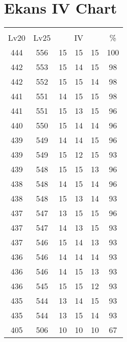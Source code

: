 \documentclass{article}%
\begin{document}
%
\normalsize%
\section{Ekans IV Chart}%
\label{sec:Ekans IV Chart}%
\renewcommand{\arraystretch}{1.5}%
\begin{tabular}{|c|c|c|c|c|c|}%
\hline%
\multicolumn{6}{|c|}{\textcolor{white}{ 
\linebreak{Ekans}
}%
\cellcolor{black}}\\%
\multicolumn{1}{|c}{Lv20}&\multicolumn{1}{c|}{Lv25}&\multicolumn{3}{c|}{IV}&\multicolumn{1}{|c|}{\%}\\%
\hline%
\rowcolor{color100}%
444&556&15&15&15&100\\%
\hline%
\rowcolor{color98}%
442&553&15&14&15&98\\%
\hline%
\rowcolor{color98}%
442&552&15&15&14&98\\%
\hline%
\rowcolor{color98}%
441&551&14&15&15&98\\%
\hline%
\rowcolor{color96}%
441&551&15&13&15&96\\%
\hline%
\rowcolor{color96}%
440&550&15&14&14&96\\%
\hline%
\rowcolor{color96}%
439&549&14&14&15&96\\%
\hline%
\rowcolor{color93}%
439&549&15&12&15&93\\%
\hline%
\rowcolor{color96}%
439&548&15&15&13&96\\%
\hline%
\rowcolor{color96}%
438&548&14&15&14&96\\%
\hline%
\rowcolor{color93}%
438&548&15&13&14&93\\%
\hline%
\rowcolor{color96}%
437&547&13&15&15&96\\%
\hline%
\rowcolor{color93}%
437&547&14&13&15&93\\%
\hline%
\rowcolor{color93}%
437&546&15&14&13&93\\%
\hline%
\rowcolor{color93}%
436&546&14&14&14&93\\%
\hline%
\rowcolor{color93}%
436&546&14&15&13&93\\%
\hline%
\rowcolor{color93}%
436&545&15&15&12&93\\%
\hline%
\rowcolor{color93}%
435&544&13&14&15&93\\%
\hline%
\rowcolor{color93}%
435&544&13&15&14&93\\%
\hline%
\rowcolor{color91}%
405&506&10&10&10&67\\%
\end{tabular}

%
\end{document}
